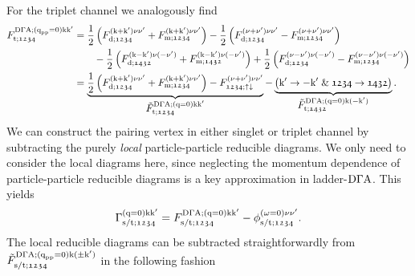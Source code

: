 \documentclass[../../main.tex]{subfiles}
\begin{document}
For the triplet channel we analogously find
\begin{align}\label{eq:ladder_f_trip}
\begin{split}
	F_{\text{t};\mathfrak{1234}}^{\text{D}\Gamma\text{A};(\text{q}_{\text{pp}}=0)\text{k}\text{k}'}&=\frac12\left (F_{\text{d};\mathfrak{1234}}^{(\text{k}+\text{k}')\nu\nu'}+F_{\text{m};\mathfrak{1234}}^{(\text{k}+\text{k}')\nu\nu'}\right )-\frac12\left (F_{\text{d};\mathfrak{1234}}^{(\nu+\nu')\nu\nu'}-F_{\text{m};\mathfrak{1234}}^{(\nu+\nu')\nu\nu'}\right )\\
	&\qquad-\frac12\left (F_{\text{d};\mathfrak{1432}}^{(\text{k}-\text{k}')\nu(-\nu')}+F_{\text{m};\mathfrak{1432}}^{(\text{k}-\text{k}')\nu(-\nu')}\right )+\frac12\left (F_{\text{d};\mathfrak{1234}}^{(\nu-\nu')\nu(-\nu')}-F_{\text{m};\mathfrak{1234}}^{(\nu-\nu')\nu(-\nu')}\right )\\
	&=\underbrace{\frac12\left (F_{\text{d};\mathfrak{1234}}^{(\text{k}+\text{k}')\nu\nu'}+F_{\text{m};\mathfrak{1234}}^{(\text{k}+\text{k}')\nu\nu'}\right )-F_{\mathfrak{1234};\uparrow\downarrow}^{(\nu+\nu')\nu\nu'}}_{\textstyle\tilde{F}_{\text{t};\mathfrak{1234}}^{\text{D}\Gamma\text{A};(\text{q}=0)\text{k}\text{k}'}}-\underbrace{\left (\text{k}'\rightarrow -\text{k}'\;\&\; \mathfrak{1234}\rightarrow\mathfrak{1432}\right )}_{\textstyle\tilde{F}_{\text{t};\mathfrak{1432}}^{\text{D}\Gamma\text{A};(\text{q}=0)\text{k}(-\text{k}')}}.
\end{split}
\end{align}
We can construct the pairing vertex in either singlet or triplet channel by subtracting the purely \textit{local} particle-particle reducible diagrams. We only need to consider the local diagrams here, since neglecting the momentum dependence of particle-particle reducible diagrams is a key approximation in ladder-$\text{D}\Gamma\text{A}$. This yields
\begin{align}
	\Gamma_{\text{s}/\text{t};\mathfrak{1234}}^{(\text{q}=0)\text{k}\text{k}'}=F_{\text{s}/\text{t};\mathfrak{1234}}^{\text{D}\Gamma\text{A};(\text{q}=0)\text{k}\text{k}'}-\phi_{\text{s}/\text{t};\mathfrak{1234}}^{(\omega=0)\nu\nu'}.
\end{align}
The local reducible diagrams can be subtracted straightforwardly from $\tilde{F}_{\text{s}/\text{t};\mathfrak{1234}}^{\text{D}\Gamma\text{A};(\text{q}_{\text{pp}}=0)\text{k}(\pm\text{k}')}$ in the following fashion
\end{document}

